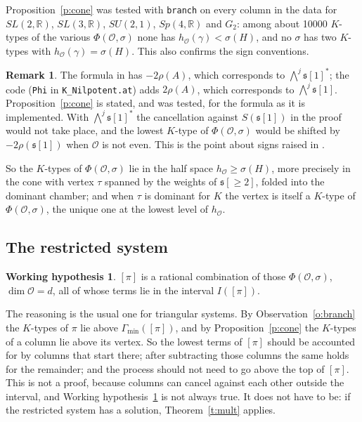 \documentclass[11pt,leqno]{article}
\theoremstyle{definition}
\newtheorem{heuristic}[equation]{Working hypothesis}
\newtheorem{remark}[equation]{Remark}
\numberwithin{equation}{section}
\newcommand{\Ob}{\mathcal O}
\newcommand{\fs}{\mathfrak s}
\newcommand{\R}{\mathbb R}
\newcommand{\at}[1]{\texttt{#1}}
\begin{document}
Proposition~\ref{p:cone} was tested with \at{branch} on every column in the
data for $SL(2,\R)$, $SL(3,\R)$, $SU(2,1)$, $Sp(4,\R)$ and $G_2$: among about
10000 $K$-types of the various $\Phi(\Ob,\sigma)$ none has
$h_\Ob(\gamma)<\sigma(H)$, and no $\sigma$ has two $K$-types with
$h_\Ob(\gamma)=\sigma(H)$.  This also confirms the sign conventions.

\begin{remark}
\label{r:sign}
The formula in \cite[Section~6]{KN} has $-2\rho(A)$, which corresponds to
$\bigwedge^j\fs[1]^*$; the code (\at{Phi} in \at{K\_Nilpotent.at}) adds
$2\rho(A)$, which corresponds to $\bigwedge^j\fs[1]$.
Proposition~\ref{p:cone} is stated, and was tested, for the formula as it is
implemented.  With $\bigwedge^j\fs[1]^*$ the cancellation against
$S(\fs[1])$ in the proof would not take place, and the lowest $K$-type of
$\Phi(\Ob,\sigma)$ would be shifted by $-2\rho(\fs[1])$ when $\Ob$ is not
even.  This is the point about signs raised in \cite[Section~6]{KN}.
\end{remark}

So the $K$-types of $\Phi(\Ob,\sigma)$ lie in the half space
$h_\Ob\ge\sigma(H)$, more precisely in the cone with vertex $\tau$ spanned by
the weights of $\fs[\ge 2]$, folded into the dominant chamber; and when $\tau$
is dominant for $K$ the vertex is itself a $K$-type of $\Phi(\Ob,\sigma)$,
the unique one at the lowest level of $h_\Ob$.

\subsection{The restricted system}

\begin{heuristic}
\label{h:interval}
$[\pi]$ is a rational combination of those $\Phi(\Ob,\sigma)$, $\dim\Ob=d$,
all of whose terms lie in the interval $I([\pi])$.
\end{heuristic}

The reasoning is the usual one for triangular systems.  By
Observation~\ref{o:branch} the $K$-types of $\pi$ lie above
$\Gamma_{\min}([\pi])$, and by Proposition~\ref{p:cone} the $K$-types of a
column lie above its vertex.  So the lowest terms of $[\pi]$ should be
accounted for by columns that start there; after subtracting those columns
the same holds for the remainder; and the process should not need to go above
the top of $[\pi]$.  This is not a proof, because columns can
cancel against each other outside the interval, and
Working hypothesis~\ref{h:interval} is not always true.  It does not have to be:
if the restricted system has a solution, Theorem~\ref{t:mult} applies.
\end{document}
